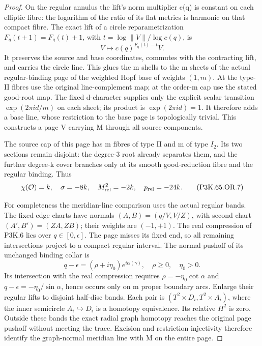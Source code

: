 \begin{proof}
On the regular annulus the lift's norm multiplier c(q) is constant
on each elliptic fibre: the logarithm of the ratio of its flat
metrics is harmonic on that compact fibre. The exact lift of a
circle reparametrization \(F_q(t+1)=F_q(t)+1\), with
\(t=\log\|V\|/\log c(q)\), is
\[
                  V\mapsto c(q)^{F_q(t)-t}V.
\]
It preserves the source and base coordinates, commutes with the
contracting lift, and carries the circle line. This glues the m
shells to the m sheets of the actual regular-binding page of the
weighted Hopf base of weights \((1,m)\). At the type-II fibres
use the original line-complement map; at the order-m cap use the
stated good-root map. The fixed d-character supplies only the
explicit scalar transition \(\exp(2\pi i d/m)\) on each sheet;
its product is \(\exp(2\pi i d)=1\). It therefore adds a base
line, whose restriction to the base page is topologically trivial.
This constructs a page V carrying M through all source components.

The source cap of this page has m fibres of type II and m of type
\(I_2\). Its two sections remain disjoint: the degree-3 root
already separates them, and the further degree-k cover branches
only at its smooth good-reduction fibre and the regular binding.
Thus
\[
 \chi(\mathcal O)=k,\quad \sigma=-8k,\quad
 M_{\rm rel}^2=-2k,\quad p_{\rm rel}=-24k.           \tag{P3K.65.OR.7}
\]

For completeness the meridian-line comparison uses the actual
regular bands. The fixed-edge charts have normals
\((A,B)=(q/V,V/Z)\), with second chart
\((A',B')=(ZA,ZB)\); their weights are \((-1,+1)\).
The real compression of P3K.6 lies over \(q\in[0,\epsilon]\).
The page misses its fixed end, so all remaining intersections
project to a compact regular interval. The normal pushoff of its
unchanged binding collar is
\[
 q-\epsilon=(\rho+i\eta_0)e^{i\alpha(\gamma)},\quad
 \rho\ge0,\quad \eta_0>0.
\]
Its intersection with the real compression requires
\(\rho=-\eta_0\cot\alpha\) and
\(q-\epsilon=-\eta_0/\sin\alpha\), hence occurs only on m
proper boundary arcs. Enlarge their regular lifts to disjoint
half-disc bands. Each pair is
\((T^2\times D_i,T^2\times A_i)\), where the inner semicircle
\(A_i\hookrightarrow D_i\) is a homotopy equivalence. Its
relative \(H^2\) is zero. Outside these bands the exact radial
graph homotopy reaches the original page pushoff without meeting
the trace. Excision and restriction injectivity therefore identify
the graph-normal meridian line with M on the entire page.


\end{proof}
